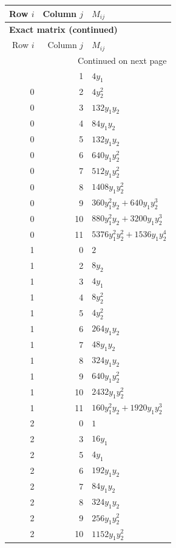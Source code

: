 \documentclass[10pt,a4paper]{article}
\begin{document}
{\small\setlength{\tabcolsep}{7pt}\begin{longtable}{rrp{125mm}}
\toprule Row $i$ & Column $j$ & $M_{ij}$\\\midrule\endfirsthead
\multicolumn{3}{l}{\textbf{Exact matrix (continued)}}\\
\toprule Row $i$ & Column $j$ & $M_{ij}$\\\midrule\endhead
\midrule\multicolumn{3}{r}{Continued on next page}\\\endfoot\bottomrule\endlastfoot
0 & 1 & $4 y_{1}$\\
0 & 2 & $4 y_{2}^{2}$\\
0 & 3 & $132 y_{1} y_{2}$\\
0 & 4 & $84 y_{1} y_{2}$\\
0 & 5 & $132 y_{1} y_{2}$\\
0 & 6 & $640 y_{1} y_{2}^{2}$\\
0 & 7 & $512 y_{1} y_{2}^{2}$\\
0 & 8 & $1408 y_{1} y_{2}^{2}$\\
0 & 9 & $360 y_{1}^{2} y_{2} + 640 y_{1} y_{2}^{3}$\\
0 & 10 & $880 y_{1}^{2} y_{2} + 3200 y_{1} y_{2}^{3}$\\
0 & 11 & $5376 y_{1}^{2} y_{2}^{2} + 1536 y_{1} y_{2}^{4}$\\
1 & 0 & $2$\\
1 & 2 & $8 y_{2}$\\
1 & 3 & $4 y_{1}$\\
1 & 4 & $8 y_{2}^{2}$\\
1 & 5 & $4 y_{2}^{2}$\\
1 & 6 & $264 y_{1} y_{2}$\\
1 & 7 & $48 y_{1} y_{2}$\\
1 & 8 & $324 y_{1} y_{2}$\\
1 & 9 & $640 y_{1} y_{2}^{2}$\\
1 & 10 & $2432 y_{1} y_{2}^{2}$\\
1 & 11 & $160 y_{1}^{2} y_{2} + 1920 y_{1} y_{2}^{3}$\\
2 & 0 & $1$\\
2 & 3 & $16 y_{1}$\\
2 & 5 & $4 y_{1}$\\
2 & 6 & $192 y_{1} y_{2}$\\
2 & 7 & $84 y_{1} y_{2}$\\
2 & 8 & $324 y_{1} y_{2}$\\
2 & 9 & $256 y_{1} y_{2}^{2}$\\
2 & 10 & $1152 y_{1} y_{2}^{2}$\\

\end{longtable}}
\end{document}
